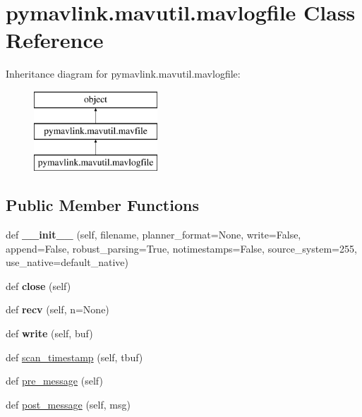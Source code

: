 \hypertarget{classpymavlink_1_1mavutil_1_1mavlogfile}{}\section{pymavlink.\+mavutil.\+mavlogfile Class Reference}
\label{classpymavlink_1_1mavutil_1_1mavlogfile}
Inheritance diagram for pymavlink.\+mavutil.\+mavlogfile\+:\begin{figure}[H]
\begin{center}
\leavevmode
\includegraphics[height=3.000000cm]{classpymavlink_1_1mavutil_1_1mavlogfile}
\end{center}
\end{figure}
\subsection*{Public Member Functions}
\begin{DoxyCompactItemize}
\item 
\mbox{\label{classpymavlink_1_1mavutil_1_1mavlogfile_aded45990324f2ba434f907ef22255095}} 
def {\bfseries \+\_\+\+\_\+init\+\_\+\+\_\+} (self, filename, planner\+\_\+format=None, write=False, append=False, robust\+\_\+parsing=True, notimestamps=False, source\+\_\+system=255, use\+\_\+native=default\+\_\+native)
\item 
\mbox{\label{classpymavlink_1_1mavutil_1_1mavlogfile_af5763cfaff07bf0270943e98f9a10556}} 
def {\bfseries close} (self)
\item 
\mbox{\label{classpymavlink_1_1mavutil_1_1mavlogfile_a3517f0936b24f1aa60ec3c90b729665e}} 
def {\bfseries recv} (self, n=None)
\item 
\mbox{\label{classpymavlink_1_1mavutil_1_1mavlogfile_a286beed914444073324880af5f611505}} 
def {\bfseries write} (self, buf)
\item 
def \hyperlink{classpymavlink_1_1mavutil_1_1mavlogfile_a53edd3e229ee05b6e9d3401d0d940bfc}{scan\+\_\+timestamp} (self, tbuf)
\item 
def \hyperlink{classpymavlink_1_1mavutil_1_1mavlogfile_ad3bd6ab83073f82be56c6d393e6ea6c3}{pre\+\_\+message} (self)
\item 
def \hyperlink{classpymavlink_1_1mavutil_1_1mavlogfile_ac304637b0b24999e12763ccbc59a2085}{post\+\_\+message} (self, msg)
\end{DoxyCompactItemize}
